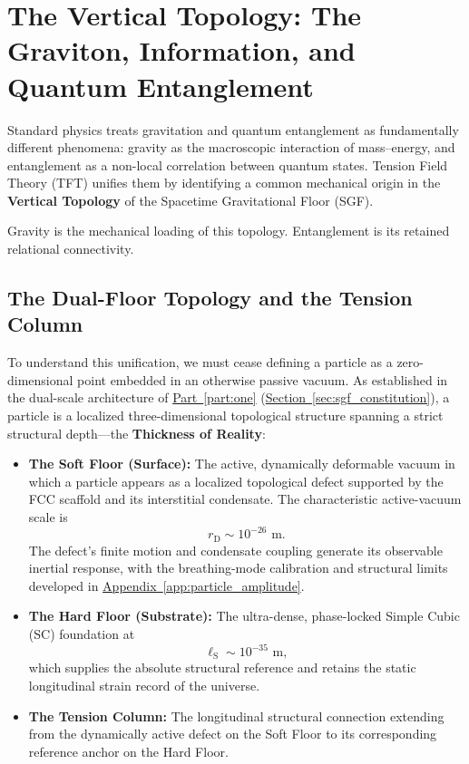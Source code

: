 \chapter{The Vertical Topology: The Graviton, Information, and Quantum Entanglement}
\label{chap:vertical_topology}

Standard physics treats gravitation and quantum entanglement as fundamentally different phenomena: gravity as the macroscopic interaction of mass--energy, and entanglement as a non-local correlation between quantum states. Tension Field Theory (TFT) unifies them by identifying a common mechanical origin in the \textbf{Vertical Topology} of the Spacetime Gravitational Floor (SGF).

Gravity is the mechanical loading of this topology. Entanglement is its retained relational connectivity.

\section{The Dual-Floor Topology and the Tension Column}
\label{sec:dual_floor_topology}

To understand this unification, we must cease defining a particle as a zero-dimensional point embedded in an otherwise passive vacuum. As established in the dual-scale architecture of \hyperref[part:one]{Part~\ref*{part:one}} (\hyperref[sec:sgf_constitution]{Section~\ref*{sec:sgf_constitution}}), a particle is a localized three-dimensional topological structure spanning a strict structural depth---the \textbf{Thickness of Reality}:

\begin{itemize}

    \item \textbf{The Soft Floor (Surface):}
    The active, dynamically deformable vacuum in which a particle appears as a localized topological defect supported by the FCC scaffold and its interstitial condensate. The characteristic active-vacuum scale is
    \begin{equation}
        r_{\mathrm D}\sim10^{-26}\text{ m}.
    \end{equation}
    The defect's finite motion and condensate coupling generate its observable inertial response, with the breathing-mode calibration and structural limits developed in
    \hyperref[app:particle_amplitude]{Appendix~\ref*{app:particle_amplitude}}.

    \item \textbf{The Hard Floor (Substrate):}
    The ultra-dense, phase-locked Simple Cubic (SC) foundation at
    \begin{equation}
        \ell_{\mathrm S}\sim10^{-35}\text{ m},
    \end{equation}
    which supplies the absolute structural reference and retains the static longitudinal strain record of the universe.

    \item \textbf{The Tension Column:}
    The longitudinal structural connection extending from the dynamically active defect on the Soft Floor to its corresponding reference anchor on the Hard Floor.

\end{itemize}

